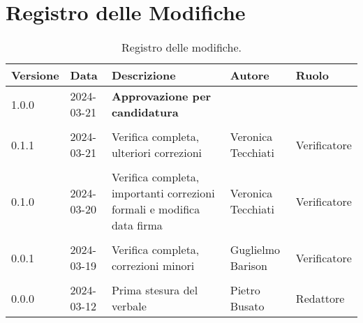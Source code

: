 \section*{Registro delle Modifiche}
\begin{table}[ht!]	
		\centering
		\begin{tabular}{p{1.2cm} p{2cm} p{6cm} p{3cm} p{2cm}}
			\toprule
			\textbf{Versione}& \textbf{Data} & \textbf{Descrizione} & \textbf{Autore} & \textbf{Ruolo} \\
			\midrule
			1.0.0 & 2024-03-21 & \textbf{Approvazione per candidatura} & & \\\\
            0.1.1 & 2024-03-21 & Verifica completa, ulteriori correzioni & Veronica Tecchiati & Verificatore \\\\
			0.1.0 & 2024-03-20 & Verifica completa, importanti correzioni formali e modifica data firma & Veronica Tecchiati & Verificatore \\\\
			0.0.1 & 2024-03-19 & Verifica completa, correzioni minori & Guglielmo Barison & Verificatore \\\\
			0.0.0 & 2024-03-12 & Prima stesura del verbale & Pietro Busato & Redattore \\
			\bottomrule
		\end{tabular}
		\caption{Registro delle modifiche.}
		\label{table:Registro delle modifiche}
\end{table}